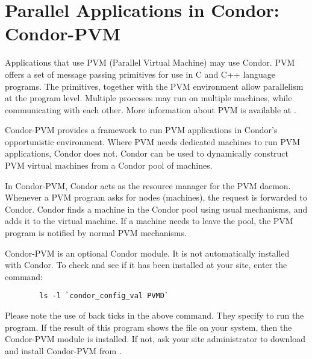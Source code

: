 \section{\label{sec:PVM}Parallel Applications in Condor: Condor-PVM}

\newcommand{\func}[1]{\texttt{#1}}

Applications that use PVM (Parallel Virtual Machine) may use
Condor.
PVM offers a set of message passing primitives for use in
C and C++ language programs.
The primitives, together with the PVM environment
allow parallelism at the program level.
Multiple processes
may run on multiple machines,
while communicating with each other.
More information about PVM is available at 
.

Condor-PVM provides a framework to run PVM applications
in Condor's opportunistic environment.
Where PVM needs dedicated machines
to run PVM applications, Condor does not.
Condor can be used to dynamically 
construct PVM virtual machines from a Condor pool of machines.

In Condor-PVM, Condor acts as the
resource manager for the PVM daemon.  Whenever a PVM program asks
for nodes (machines), the request is forwarded to Condor.
Condor finds a machine in the Condor pool using usual mechanisms,
and adds it to the virtual machine.
If a machine needs to leave the pool, the
PVM program is notified by normal PVM mechanisms.


\Note Condor-PVM is an optional Condor module.  It is not
automatically installed with Condor. To check and see if
it has been installed at your site, enter the command:
\begin{verbatim}
        ls -l `condor_config_val PVMD`
\end{verbatim}
Please note the use of back ticks in the above command.
They specify to run the  program.
If the result of this program shows the
file  on your system, then the Condor-PVM module
is installed.
If not,
ask your site administrator to download and install Condor-PVM from
.

